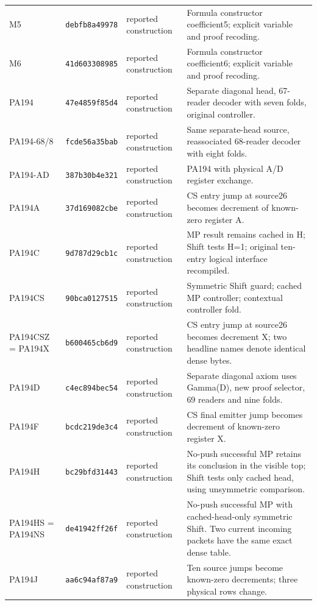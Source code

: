 \begin{longtable}{@{}p{.20\linewidth} p{.15\linewidth} p{.13\linewidth} p{.43\linewidth}@{}}
M5 & \texttt{debfb8a49978} & reported construction & Formula constructor coefficient5; explicit variable and proof recoding.\\[4pt]
M6 & \texttt{41d603308985} & reported construction & Formula constructor coefficient6; explicit variable and proof recoding.\\[4pt]
PA194 & \texttt{47e4859f85d4} & reported construction & Separate diagonal head, 67-reader decoder with seven folds, original controller.\\[4pt]
PA194-68/8 & \texttt{fcde56a35bab} & reported construction & Same separate-head source, reassociated 68-reader decoder with eight folds.\\[4pt]
PA194-AD & \texttt{387b30b4e321} & reported construction & PA194 with physical A/D register exchange.\\[4pt]
PA194A & \texttt{37d169082cbe} & reported construction & CS entry jump at source26 becomes decrement of known-zero register A.\\[4pt]
PA194C & \texttt{9d787d29cb1c} & reported construction & MP result remains cached in H; Shift tests H=1; original ten-entry logical interface recompiled.\\[4pt]
PA194CS & \texttt{90bca0127515} & reported construction & Symmetric Shift guard; cached MP controller; contextual controller fold.\\[4pt]
PA194CSZ = PA194X & \texttt{b600465cb6d9} & reported construction & CS entry jump at source26 becomes decrement X; two headline names denote identical dense bytes.\\[4pt]
PA194D & \texttt{c4ec894bec54} & reported construction & Separate diagonal axiom uses Gamma(D), new proof selector, 69 readers and nine folds.\\[4pt]
PA194F & \texttt{bcdc219de3c4} & reported construction & CS final emitter jump becomes decrement of known-zero register X.\\[4pt]
PA194H & \texttt{bc29bfd31443} & reported construction & No-push successful MP retains its conclusion in the visible top; Shift tests only cached head, using unsymmetric comparison.\\[4pt]
PA194HS = PA194NS & \texttt{de41942ff26f} & reported construction & No-push successful MP with cached-head-only symmetric Shift. Two current incoming packets have the same exact dense table.\\[4pt]
PA194J & \texttt{aa6c94af87a9} & reported construction & Ten source jumps become known-zero decrements; three physical rows change.\\[4pt]

\end{longtable}
